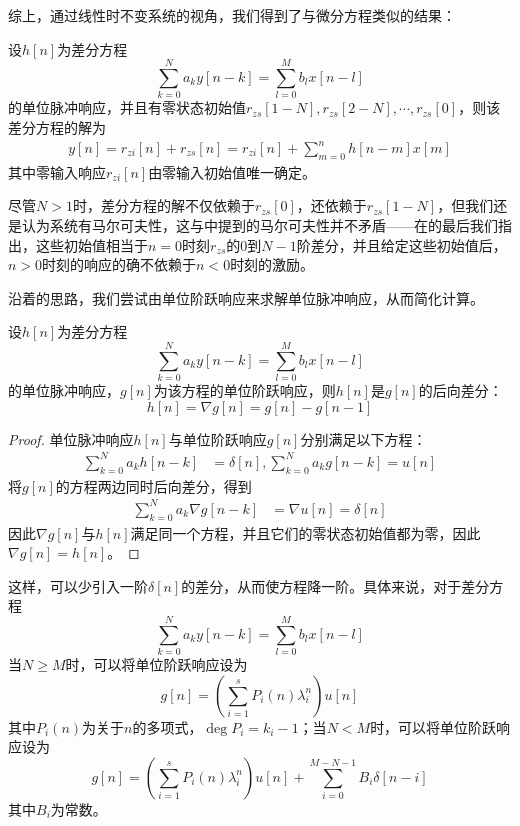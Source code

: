 综上，通过线性时不变系统的视角，我们得到了与微分方程类似的结果：
\begin{theorem}
    设$h[n]$为差分方程
    $$\sum_{k=0}^{N}a_k y[n-k] = \sum_{l=0}^{M}b_l x[n-l]$$
    的单位脉冲响应，并且有零状态初始值$r_{zs}[1-N],r_{zs}[2-N],\cdots,r_{zs}[0]$，则该差分方程的解为
    \begin{align*}
        y[n]=r_{zi}[n]+r_{zs}[n]=r_{zi}[n]+\sum_{m=0}^{n}h[n-m]x[m]
    \end{align*}
    其中零输入响应$r_{zi}[n]$由零输入初始值唯一确定。
\end{theorem}

尽管$N>1$时，差分方程的解不仅依赖于$r_{zs}[0]$，还依赖于$r_{zs}[1-N]$，但我们还是认为系统有马尔可夫性，这与中提到的马尔可夫性并不矛盾——在的最后我们指出，这些初始值相当于$n=0$时刻$r_{zs}$的$0$到$N-1$阶差分，并且给定这些初始值后，$n>0$时刻的响应的确不依赖于$n<0$时刻的激励。

沿着的思路，我们尝试由单位阶跃响应来求解单位脉冲响应，从而简化计算。

\begin{lemma}
    设$h[n]$为差分方程
    $$\sum_{k=0}^{N}a_k y[n-k] = \sum_{l=0}^{M}b_l x[n-l]$$
    的单位脉冲响应，$g[n]$为该方程的单位阶跃响应，则$h[n]$是$g[n]$的后向差分：
    $$h[n]=\nabla g[n]=g[n]-g[n-1]$$
\end{lemma}
\begin{proof}
    单位脉冲响应$h[n]$与单位阶跃响应$g[n]$分别满足以下方程：
    \begin{align*}
        \sum_{k=0}^{N}a_k h[n-k] &= \delta[n],\sum_{k=0}^{N}a_k g[n-k]= u[n]
    \end{align*}
    将$g[n]$的方程两边同时后向差分，得到\begin{align*}
    \sum_{k=0}^{N}a_k \nabla g[n-k] &= \nabla u[n]=\delta[n]
    \end{align*}
    因此$\nabla g[n]$与$h[n]$满足同一个方程，并且它们的零状态初始值都为零，因此$\nabla g[n]=h[n]$。
\end{proof}

这样，可以少引入一阶$\delta[n]$的差分，从而使方程降一阶。具体来说，对于差分方程
$$\sum_{k=0}^{N}a_k y[n-k] = \sum_{l=0}^{M}b_l x[n-l]$$
当$N\geq M$时，可以将单位阶跃响应设为
$$g[n]=\left(\sum_{i=1}^s P_i(n) \lambda_i^n \right)u[n]$$
其中$P_i(n)$为关于$n$的多项式，$\deg P_i=k_i-1$；当$N<M$时，可以将单位阶跃响应设为
$$g[n]=\left(\sum_{i=1}^s P_i(n) \lambda_i^n \right)u[n]+\sum_{i=0}^{M-N-1}B_i\delta[n-i]$$
其中$B_i$为常数。

